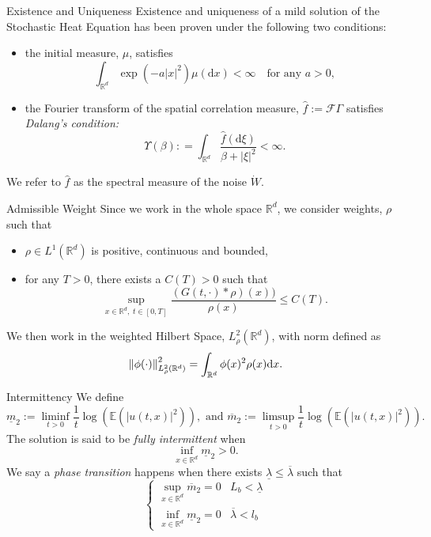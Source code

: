 \documentclass{beamer}%
\numberwithin{equation}{section}
\newcommand{\R}{\mathbb{R}}
\newcommand{\Norm}[1]{\left\|  #1   \right\|}
\newcommand{\ud}{\ensuremath{\mathrm{d} }}
\begin{document}
\begin{frame}{Existence and Uniqueness}
Existence and uniqueness of a mild solution of the Stochastic Heat Equation has been proven under the following two conditions: \vspace{.1in}
	\begin{itemize}
		\item the initial measure, $\mu$, satisfies 
			\[
				\int_{\R^d} \exp(-a|x|^2) \mu(\ud x) < \infty \quad \text{for any } a>0,
			\]
		\item the Fourier transform of the spatial correlation measure, $\hat{f} := \mathcal{F}\Gamma$ satisfies {\it Dalang's condition:}
			\[
				\Upsilon(\beta) : = \int_{\R^d} \frac{\hat{f}(\ud \xi)}{\beta + |\xi|^2} < \infty.
			\]
	\end{itemize}
We refer to $\hat{f}$ as the spectral measure of the noise $\dot{W}$. 
\end{frame}

\begin{frame}{Admissible Weight}
	Since we work in the whole space $\R^d$, we consider weights, $\rho$ such that \vspace{.1in}
		\begin{itemize}
			\item $\rho \in L^1(\R^d)$ is positive, continuous and bounded, \vspace{.1in}
			
			\item for any $T>0$, there exists a $C(T)>0$ such that 
			\[
				\sup_{x \in \R^d, \; t \in [0,T]} \frac{(G(t,\cdot) * \rho)(x))}{\rho(x)} \le C(T).
			\]
		\end{itemize}

We then work in the weighted Hilbert Space, $L^2_{\rho}(\R^d)$, with norm defined as
		\[
			\Norm{\phi(\cdot)}_{L^2_\rho(\R^d)}^2 = \int_{\R^d} \phi(x)^2 \rho(x) \ud x. \vspace{.1in}
		\] 
\end{frame}

\begin{frame}{Intermittency}
We define  
\[
\underline{m}_2 := \liminf_{t>0} \frac{1}{t} \log\left(\mathbb{E}(|u(t,x)|^2) \right), \text{ and } \overline{m}_2 := \limsup_{t>0} \frac{1}{t} \log\left(\mathbb{E}(|u(t,x)|^2)\right).
\]
The solution is said to be {\it fully intermittent} when 
\[
\inf_{x\in\R^d} \underline{m}_2 > 0.
\]
	We say a {\it phase transition} happens when there exists $\underline{\lambda} \le \overline\lambda$ such that 
	\[
	\begin{cases}
	\sup_{x \in \R^d} \overline{m}_2 = 0 & L_b < \underline{\lambda} \\
	\inf_{x \in \R^d} \underline{m}_2 = 0 &  \overline{\lambda} < l_b  
	\end{cases}
	\]
\end{frame}
\end{document}
